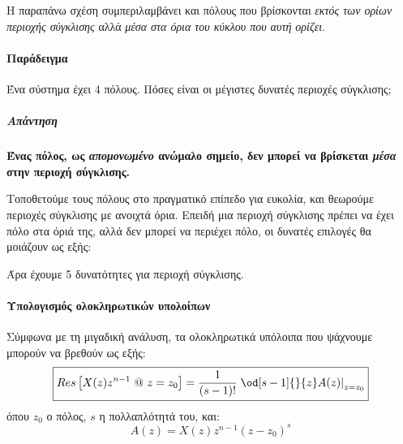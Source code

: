 \documentclass[11pt,a4paper,notitlepage,fleqn]{article}
\begin{document}
Η παραπάνω σχέση συμπεριλαμβάνει και πόλους που βρίσκονται \emph{εκτός των ορίων περιοχής σύγκλισης} αλλά
\emph{μέσα στα όρια του κύκλου που αυτή ορίζει}.

\paragraph{Παράδειγμα}
Ένα σύστημα έχει 4 πόλους. Πόσες είναι οι μέγιστες δυνατές περιοχές σύγκλισης;
\subparagraph{Απάντηση}
\textbf{Ένας πόλος, ως \emph{απομονωμένο} ανώμαλο σημείο, δεν μπορεί να βρίσκεται \emph{μέσα} στην περιοχή σύγκλισης.}

Τοποθετούμε τους πόλους στο πραγματικό επίπεδο για ευκολία, και θεωρούμε περιοχές σύγκλισης με ανοιχτά
όρια. Επειδή μια περιοχή σύγκλισης πρέπει να έχει πόλο στα όριά της, αλλά δεν μπορεί να περιέχει πόλο,
οι δυνατές επιλογές θα μοιάζουν ως εξής:


Άρα έχουμε 5 δυνατότητες για περιοχή σύγκλισης.

\paragraph{Υπολογισμός ολοκληρωτικών υπολοίπων}
\label{sec:rescalc}
Σύμφωνα με τη μιγαδική ανάλυση, τα ολοκληρωτικά υπόλοιπα που ψάχνουμε μπορούν να βρεθούν ως εξής:
\[
\boxed{
\mathop{Res}\left[
X(z)z^{n-1} \ @\ z=z_0
\right] = \frac{1}{(s-1)!} \left.\od[s-1]{}{z} A(z)\right|_{z=z_0}
}
\]
όπου \( z_0 \) ο πόλος, \( s \) η πολλαπλότητά του, και:
\[
A(z) = X(z)z^{n-1}(z-z_0)^s
\]
\end{document}
